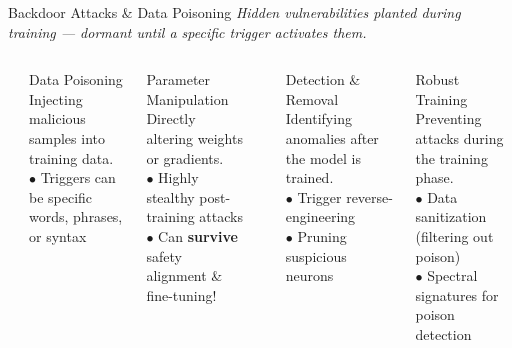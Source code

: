 \begin{frame}{Backdoor Attacks \& Data Poisoning}
  {\footnotesize\itshape Hidden vulnerabilities planted during training ---
    dormant until a specific trigger activates them.}
  \vspace{0.3em}

  \begin{columns}[T]
    {\small\bfseries{}}
    \begin{ucrcard}[UCRnavy]{Data Poisoning}
      \scriptsize
      Injecting malicious samples into training data.\\[2pt]
      $\bullet$ Triggers can be specific words, phrases, or syntax
    \end{ucrcard}

    \vspace{0.3em}
    \begin{ucrcard}[UCRnavy]{Parameter Manipulation}
      \scriptsize
      Directly altering weights or gradients.\\[2pt]
      $\bullet$ Highly stealthy post-training attacks\\
      $\bullet$ Can \textbf{survive} safety alignment \& fine-tuning!
    \end{ucrcard}

    {\small\bfseries{}}
    \begin{ucrcard}[UCRnavy]{Detection \& Removal}
      \scriptsize
      Identifying anomalies after the model is trained.\\[2pt]
      $\bullet$ Trigger reverse-engineering\\
      $\bullet$ Pruning suspicious neurons
    \end{ucrcard}

    \vspace{0.3em}
    \begin{ucrcard}[UCRnavy]{Robust Training}
      \scriptsize
      Preventing attacks during the training phase.\\[2pt]
      $\bullet$ Data sanitization (filtering out poison)\\
      $\bullet$ Spectral signatures for poison detection
    \end{ucrcard}
  \end{columns}


\end{frame}


